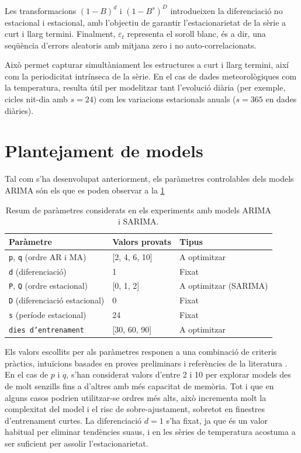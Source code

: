 \documentclass[../main.tex]{subfiles}
\begin{document}
Les transformacions $(1 - B)^d$ i $(1 - B^s)^D$ introdueixen la diferenciació no estacional i estacional, amb l’objectiu de garantir l’estacionarietat de la sèrie a curt i llarg termini. Finalment, $\varepsilon_t$ representa el soroll blanc, és a dir, una seqüència d’errors aleatoris amb mitjana zero i no auto-correlacionats.

Això permet capturar simultàniament les estructures a curt i llarg termini, així com la periodicitat intrínseca de la sèrie. En el cas de dades meteorològiques com la temperatura, resulta útil per modelitzar tant l’evolució diària (per exemple, cicles nit-dia amb $s = 24$) com les variacions estacionals anuals ($s = 365$ en dades diàries).


\section{Plantejament de models}

Tal com s'ha desenvolupat anteriorment, els paràmetres controlables dels models ARIMA són els que es poden observar a la \cref{tab:resum_params_arima}
\begin{table}[H]
    \centering
    \renewcommand{\arraystretch}{1.3}
    \begin{tabular}{lll}
        \toprule
        \textbf{Paràmetre} & \textbf{Valors provats} & \textbf{Tipus} \\
        \midrule
        \texttt{p}, \texttt{q} (ordre AR i MA)   & [2, 4, 6, 10]   & A optimitzar \\
        \texttt{d} (diferenciació)              & 1               & Fixat \\
        \midrule
        \texttt{P}, \texttt{Q} (ordre estacional) & [0, 1, 2]      & A optimitzar (SARIMA) \\
        \texttt{D} (diferenciació estacional)     & 0              & Fixat \\
        \texttt{s} (període estacional)           & 24             & Fixat \\
        \midrule
        \texttt{dies d’entrenament}              & [30, 60, 90]    & A optimitzar \\
        \bottomrule
    \end{tabular}
    \caption{Resum de paràmetres considerats en els experiments amb models ARIMA i SARIMA.}
    \label{tab:resum_params_arima}
\end{table}
Els valors escollits per als paràmetres responen a una combinació de criteris pràctics, intuïcions basades en proves preliminars i referències de la literatura \parencite{elseidi2024hybrid, murat2018forecasting, koccak2023time}. En el cas de $p$ i $q$, s’han considerat valors d’entre 2 i 10 per explorar models des de molt senzills fins a d’altres amb més capacitat de memòria. Tot i que en alguns casos podrien utilitzar-se ordres més alts, això incrementa molt la complexitat del model i el risc de sobre-ajustament, sobretot en finestres d’entrenament curtes. La diferenciació $d = 1$ s’ha fixat, ja que és un valor habitual per eliminar tendències suaus, i en les sèries de temperatura acostuma a ser suficient per assolir l’estacionarietat.
\end{document}
